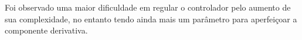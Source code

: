 Foi observado uma maior dificuldade em regular o controlador pelo aumento de sua complexidade,  no entanto tendo ainda mais
um parâmetro para aperfeiçoar a componente derivativa.